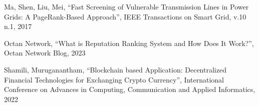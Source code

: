 \documentclass[a4paper]{article}
\begin{document}
\begin{thebibliography}{Com79}
 Ma, Shen, Liu, Mei, ``Fast Screening of Vulnerable Transmission Lines in Power Grids: A PageRank-Based Approach'', IEEE Transactions on Smart Grid, v.10 n.1, 2017

 Octan Network, ``What is Reputation Ranking System and How Does It Work?'', Octan Network Blog, 2023

 Shamili, Muruganantham, ``Blockchain based Application: Decentralized Financial Technologies for Exchanging Crypto Currency'', International Conference on Advances in Computing, Communication and Applied Informatics, 2022









\end{thebibliography}
\end{document}
